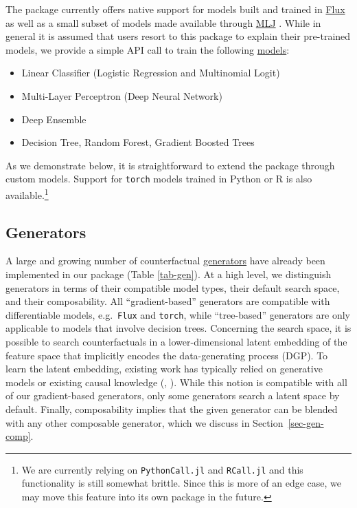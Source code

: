 \documentclass[
  letterpaper,
  DIV=11,
  numbers=noendperiod]{scrartcl}
\begin{document}
The package currently offers native support for models built and trained
in \href{https://fluxml.ai/}{Flux} \cite{innes2018flux} as well as a
small subset of models made available through
\href{https://alan-turing-institute.github.io/MLJ.jl/dev/}{MLJ}
\cite{blaom2020mlj}. While in general it is assumed that users resort to
this package to explain their pre-trained models, we provide a simple
API call to train the following
\href{https://juliatrustworthyai.github.io/CounterfactualExplanations.jl/v0.1/tutorials/model_catalogue/}{models}:

\begin{itemize}
\item Linear Classifier (Logistic Regression and Multinomial Logit)
\item Multi-Layer Perceptron (Deep Neural Network)
\item Deep Ensemble \cite{lakshminarayanan2016simple}
\item Decision Tree, Random Forest, Gradient Boosted Trees
\end{itemize}

As we demonstrate below, it is straightforward to extend the package
through custom models. Support for \texttt{torch} models trained in
Python or R is also available.\footnote{We are currently relying on
  \texttt{PythonCall.jl} and \texttt{RCall.jl} and this functionality is
  still somewhat brittle. Since this is more of an edge case, we may
  move this feature into its own package in the future.}

\hypertarget{sec-gen}{%
\subsection{Generators}\label{sec-gen}}

A large and growing number of counterfactual
\href{https://juliatrustworthyai.github.io/CounterfactualExplanations.jl/v0.1/explanation/generators/overview/}{generators}
have already been implemented in our package (Table \ref{tab-gen}). At a
high level, we distinguish generators in terms of their compatible model
types, their default search space, and their composability. All
``gradient-based'' generators are compatible with differentiable models,
e.g.~\texttt{Flux} and \texttt{torch}, while ``tree-based'' generators
are only applicable to models that involve decision trees. Concerning
the search space, it is possible to search counterfactuals in a
lower-dimensional latent embedding of the feature space that implicitly
encodes the data-generating process (DGP). To learn the latent
embedding, existing work has typically relied on generative models or
existing causal knowledge (\cite{joshi2019realistic},
\cite{karimi2021algorithmic}). While this notion is compatible with all
of our gradient-based generators, only some generators search a latent
space by default. Finally, composability implies that the given
generator can be blended with any other composable generator, which we
discuss in Section~\ref{sec-gen-comp}.
\end{document}
